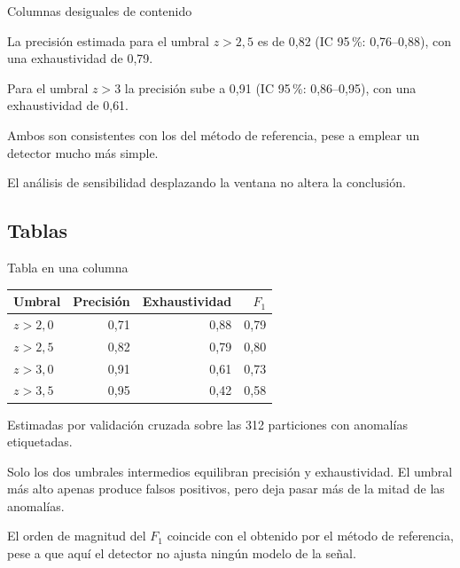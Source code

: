 \documentclass[aspectratio=169,9pt]{beamer}
\begin{document}
\begin{frame}{Columnas desiguales de contenido}
\begin{twocols}

  La precisión estimada para el umbral $z > 2{,}5$ es de 0{,}82
  (IC 95\,\%: 0{,}76--0{,}88), con una exhaustividad de 0{,}79.

  Para el umbral $z > 3$ la precisión sube a 0{,}91 (IC 95\,\%:
  0{,}86--0{,}95), con una exhaustividad de 0{,}61.

  Ambos son consistentes con los del método de referencia, pese a emplear
  un detector mucho más simple.

  El análisis de sensibilidad desplazando la ventana no altera la
  conclusión.
\nextcol
\end{twocols}
\end{frame}

\subsection{Tablas}

\begin{frame}{Tabla en una columna}
\begin{twocols}

  \begin{tabular}{@{}lrrr@{}}
    \toprule
    Umbral        & Precisión & Exhaustividad & $F_1$ \\
    \midrule
    $z > 2{,}0$   & 0,71  & 0,88  & 0,79 \\
    $z > 2{,}5$   & 0,82  & 0,79  & 0,80 \\
    $z > 3{,}0$   & 0,91  & 0,61  & 0,73 \\
    $z > 3{,}5$   & 0,95  & 0,42  & 0,58 \\
    \bottomrule
  \end{tabular}

  Estimadas por validación cruzada sobre las 312 particiones con anomalías
  etiquetadas.
\nextcol

  Solo los dos umbrales intermedios equilibran precisión y exhaustividad.
  El umbral más alto apenas produce falsos positivos, pero deja pasar más de
  la mitad de las anomalías.

  El orden de magnitud del $F_1$ coincide con el obtenido por el método de
  referencia, pese a que aquí el detector no ajusta ningún modelo de la
  señal.
\end{twocols}
\end{frame}
\end{document}
